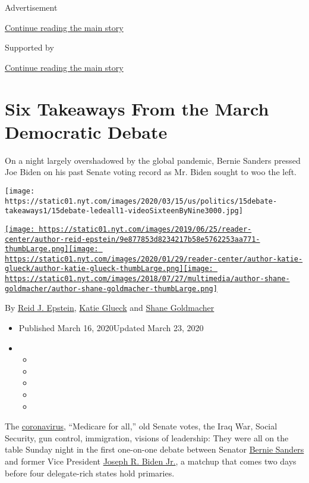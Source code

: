 Advertisement

\protect\hyperlink{after-top}{Continue reading the main story}

Supported by

\protect\hyperlink{after-sponsor}{Continue reading the main story}

\hypertarget{six-takeaways-from-the-march-democratic-debate}{%
\section{Six Takeaways From the March Democratic
Debate}\label{six-takeaways-from-the-march-democratic-debate}}

On a night largely overshadowed by the global pandemic, Bernie Sanders
pressed Joe Biden on his past Senate voting record as Mr. Biden sought
to woo the left.

\texttt{[image: https://static01.nyt.com/images/2020/03/15/us/politics/15debate-takeaways1/15debate-ledeall1-videoSixteenByNine3000.jpg]}

\href{https://www.nytimes.com/by/reid-j-epstein}{\texttt{[image: https://static01.nyt.com/images/2019/06/25/reader-center/author-reid-epstein/9e877853d8234217b58e5762253aa771-thumbLarge.png]}}\href{https://www.nytimes.com/by/katie-glueck}{\texttt{[image: https://static01.nyt.com/images/2020/01/29/reader-center/author-katie-glueck/author-katie-glueck-thumbLarge.png]}}\href{https://www.nytimes.com/by/shane-goldmacher}{\texttt{[image: https://static01.nyt.com/images/2018/07/27/multimedia/author-shane-goldmacher/author-shane-goldmacher-thumbLarge.png]}}

By \href{https://www.nytimes.com/by/reid-j-epstein}{Reid J. Epstein},
\href{https://www.nytimes.com/by/katie-glueck}{Katie Glueck} and
\href{https://www.nytimes.com/by/shane-goldmacher}{Shane Goldmacher}

\begin{itemize}
\item
  Published March 16, 2020Updated March 23, 2020
\item
  \begin{itemize}
  \item
  \item
  \item
  \item
  \item
  \end{itemize}
\end{itemize}

The
\href{https://www.nytimes.com/2020/03/23/podcasts/the-daily/democratic-primary-coronavirus.html}{coronavirus},
``Medicare for all,'' old Senate votes, the Iraq War, Social Security,
gun control, immigration, visions of leadership: They were all on the
table Sunday night in the first one-on-one debate between Senator
\href{https://www.nytimes.com/interactive/2020/us/elections/bernie-sanders.html}{Bernie
Sanders} and former Vice President
\href{https://www.nytimes.com/interactive/2020/us/elections/joe-biden.html}{Joseph
R. Biden Jr.}, a matchup that comes two days before four delegate-rich
states hold primaries.

